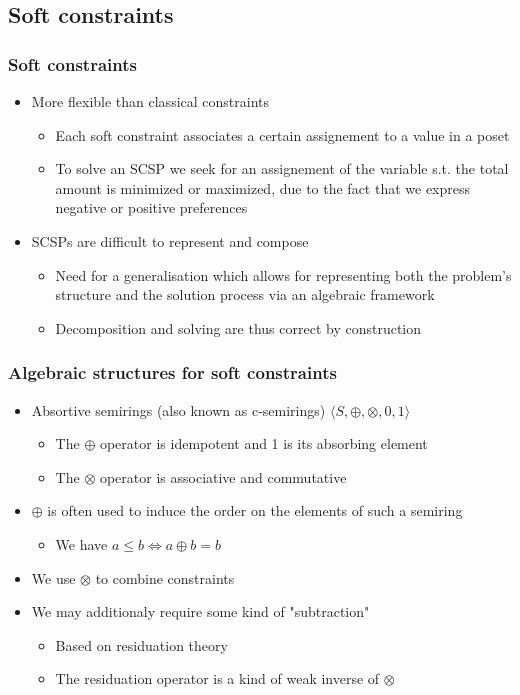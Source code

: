 \documentclass{beamer}
\begin{document}
\subsection{Soft constraints}
\begin{frame}
\frametitle{Soft constraints}
\begin{itemize}
	\item More flexible than classical constraints
	\begin{itemize}
		\item Each soft constraint associates a certain assignement to a value in a poset
		\item To solve an SCSP we seek for an assignement of the variable s.t. the total amount
		is minimized or maximized, due to the fact that we express negative or positive
		preferences
	\end{itemize}
\medskip
	\item SCSPs are difficult to represent and compose
	\begin{itemize}
		\item Need for a generalisation which allows for representing both the problem's
		structure and the solution process via an algebraic framework
		\item Decomposition and solving are thus correct by construction
	\end{itemize}
\end{itemize}
\end{frame}

\begin{frame}
\frametitle{Algebraic structures for soft constraints}
\begin{itemize}
	\item Absortive semirings (also known as c-semirings) 
	$\langle S, \oplus, \otimes, 0, 1 \rangle$
	\begin{itemize}
		\item The $\oplus$ operator is idempotent and 1 is its absorbing element
		\item The $\otimes$ operator is associative and commutative
	\end{itemize}
\medskip
	\item $\oplus$ is often used to induce the order on the elements of such a semiring
	\begin{itemize}
		\item We have $a \leq b \iff a \oplus b = b$
	\end{itemize}
\medskip
	\item We use $\otimes$ to combine constraints
\medskip
	\item We may additionaly require some kind of "subtraction"
	\begin{itemize}
		\item Based on residuation theory
		\item The residuation operator is a kind of weak inverse of $\otimes$
	\end{itemize}
\end{itemize}
\end{frame}
\end{document}
